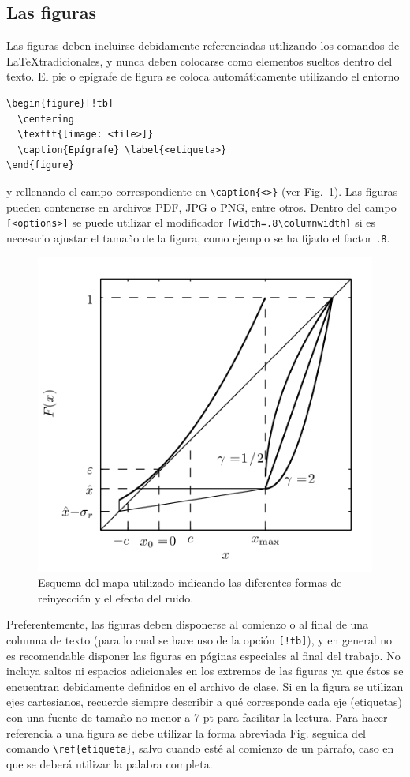 \documentclass[esp]{FCEFyN-class}
\begin{document}
\subsection{Las figuras}
Las figuras deben incluirse debidamente referenciadas utilizando los comandos de \LaTeX tradicionales,
y nunca deben colocarse como elementos sueltos dentro del texto.
El pie o epígrafe de figura se coloca automáticamente utilizando el entorno
\begin{verbatim}
\begin{figure}[!tb]
  \centering
  \texttt{[image: <file>]}
  \caption{Epígrafe} \label{<etiqueta>}
\end{figure}
\end{verbatim}
y rellenando el campo correspondiente en \verb!\caption{<>}! (ver Fig.~\ref{fig-1}). Las figuras pueden contenerse en archivos PDF, JPG o PNG, entre otros. Dentro del campo \verb![<options>]! se puede utilizar el modificador
\verb![width=.8\columnwidth]! si es necesario ajustar el tamaño de la figura, como ejemplo se ha fijado el
factor \verb!.8!.

\begin{figure}[!tb] 
 \centering
 \includegraphics[width=.8\columnwidth]{figura1} 
 \caption{Esquema del mapa utilizado indicando las diferentes formas de reinyección y el efecto
          del ruido.} \label{fig-1}
\end{figure}

Preferentemente, las figuras deben disponerse al comienzo o al final de una columna de texto (para lo
cual se hace uso de la opción \texttt{[!tb]}), y en general no es recomendable disponer las figuras en
páginas especiales al final del trabajo.
No incluya saltos ni espacios adicionales en los extremos de las figuras ya que éstos se encuentran
debidamente definidos en el archivo de clase.
Si en la figura se utilizan ejes cartesianos, recuerde siempre describir a qué corresponde cada
eje (etiquetas) con una fuente de tamaño no menor a 7 pt para facilitar la lectura.
Para hacer referencia a una figura se debe utilizar la forma abreviada Fig. seguida
del comando \verb!\ref{etiqueta}!, salvo cuando esté al comienzo de un párrafo, caso en que se
deberá utilizar la palabra completa.
\end{document}
